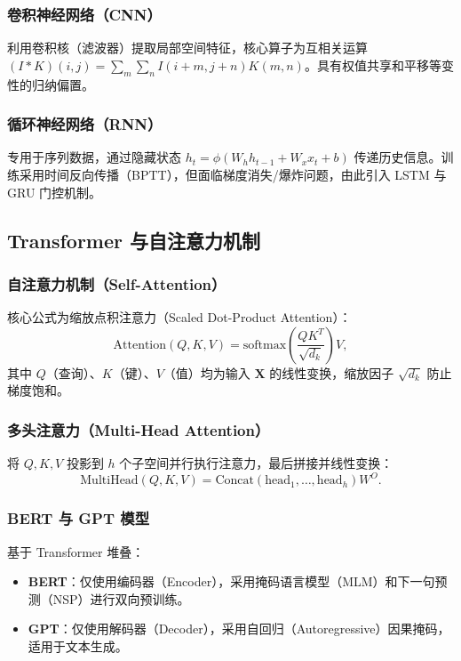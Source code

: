 \documentclass[12pt,a4paper]{ctexart}
\begin{document}
\subsubsection{卷积神经网络（CNN）}
利用卷积核（滤波器）提取局部空间特征，核心算子为互相关运算 $(I * K)(i,j) = \sum_m \sum_n I(i+m, j+n)K(m,n)$。具有权值共享和平移等变性的归纳偏置。

\subsubsection{循环神经网络（RNN）}
专用于序列数据，通过隐藏状态 $h_t = \phi(W_h h_{t-1} + W_x x_t + b)$ 传递历史信息。训练采用时间反向传播（BPTT），但面临梯度消失/爆炸问题，由此引入 LSTM 与 GRU 门控机制。

\subsection{Transformer 与自注意力机制}

\subsubsection{自注意力机制（Self-Attention）}
核心公式为缩放点积注意力（Scaled Dot-Product Attention）：
\begin{equation}
    \text{Attention}(Q, K, V) = \text{softmax}\left(\frac{Q K^T}{\sqrt{d_k}}\right) V,
\end{equation}
其中 $Q$（查询）、$K$（键）、$V$（值）均为输入 $\mathbf{X}$ 的线性变换，缩放因子 $\sqrt{d_k}$ 防止梯度饱和。

\subsubsection{多头注意力（Multi-Head Attention）}
将 $Q, K, V$ 投影到 $h$ 个子空间并行执行注意力，最后拼接并线性变换：
\begin{equation}
    \text{MultiHead}(Q, K, V) = \text{Concat}(\text{head}_1, \dots, \text{head}_h) W^O.
\end{equation}

\subsubsection{BERT 与 GPT 模型}
基于 Transformer 堆叠：
\begin{itemize}
    \item \textbf{BERT}：仅使用编码器（Encoder），采用掩码语言模型（MLM）和下一句预测（NSP）进行双向预训练。
    \item \textbf{GPT}：仅使用解码器（Decoder），采用自回归（Autoregressive）因果掩码，适用于文本生成。
\end{itemize}
\end{document}
